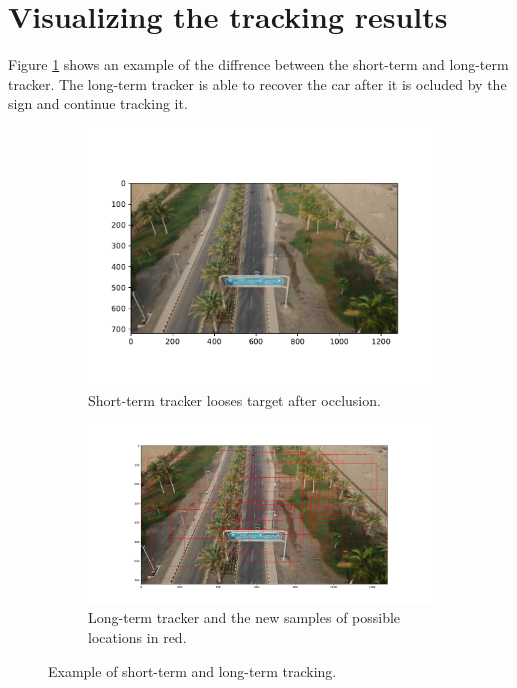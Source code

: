 \documentclass[9pt]{IEEEtran}
\begin{document}
\section{Visualizing the tracking results}
Figure \ref{fig:tracking} shows an example of the diffrence between the short-term and long-term tracker.
The long-term tracker is able to recover the car after it is ocluded by the sign and continue tracking it.
\begin{figure}[!h]
    \centering
    \begin{subfigure}{0.5\textwidth}
        \includegraphics[width=\textwidth]{st_example.pdf}
        \caption{Short-term tracker looses target after occlusion.}
    \end{subfigure}
    \begin{subfigure}{0.522\textwidth}
        \includegraphics[width=\textwidth]{longterm_ecxample.pdf}
        \caption{Long-term tracker and the new samples of possible locations in red.}
    \end{subfigure}
    \caption{Example of short-term and long-term tracking.}
    \label{fig:tracking}
\end{figure}
\end{document}
